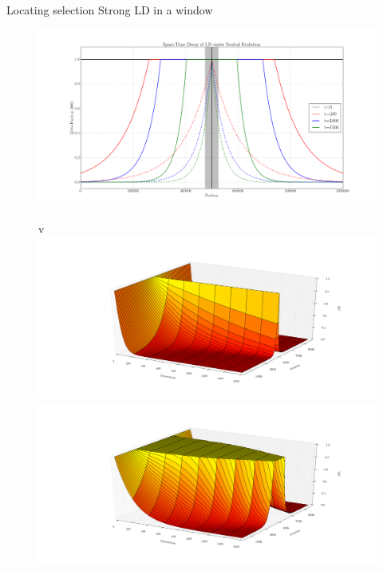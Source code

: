 \documentclass[t]{beamer} %
\begin{document}
\begin{frame}[allowframebreaks]{Locating selection}
	Strong LD in a window
\begin{figure}
	\centering
	\hspace{-0in}\includegraphics[scale=0.2]{spaceTimeLD}
\end{figure}
\begin{figure}
	\centering
	\begin{tabular}{v}
	\hspace{-0in}\includegraphics[scale=0.12]{LDDecay3dNeutral}\\
		\hspace{-0in}\includegraphics[scale=0.12]{LDDecay3dSweep}
	\end{tabular}
\end{figure}
\end{frame}
\end{document}
